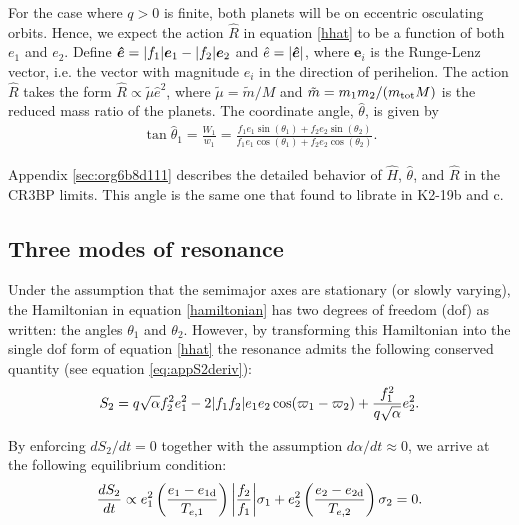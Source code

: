 \documentclass[usenatbib,twocolumn]{mnras}
\renewcommand{\v}[1]{\boldsymbol{ #1 }}
\DeclarePairedDelimiter{\abs}{|}{|}
\begin{document}
For the case where \(q>0\) is finite, both planets will be on eccentric
osculating orbits.  Hence, we expect the action \(\hat R\) in equation
\eqref{hhat} to be a function of both \(e_1\) and \(e_2\).  Define \(\v{\hat
e} = \abs{f_1}\v e_1 - \abs{f_2}\v e_2\) and \(\hat e = \abs{\v{\hat
e}}\), where \(\v e_i\) is the Runge-Lenz vector, i.e. the vector with
magnitude \(e_i\) in the direction of perihelion.  The action \(\hat R\)
takes the form \(\hat R \propto \tilde \mu \hat e^2\), where
\(\tilde\mu=\tilde m/M\) and \(\tilde m= m_1m_2/(m_{\rm tot}M)\) is the
reduced mass ratio of the planets.  The coordinate angle, \(\hat\theta\),
is given by
\begin{align}
\label{hattheta}
  \tan\hat{\theta}_1 = \frac{W_1}{w_1} = \frac{f_1 e_1\sin(\theta_1)
  + f_2e_2\sin(\theta_2)}{f_1e_1\cos(\theta_1) + f_2e_2\cos(\theta_2)}.
\end{align}

\noindent
Appendix \ref{sec:org6b8d111}
describes the detailed behavior of \(\hat H\), \(\hat \theta\),
and \(\hat R\) in the CR3BP limits.
This angle is the same one that \citet{petit_resonance_2020}
found to librate in K2-19b and c.

\subsection{Three modes of resonance}
\label{sec:org74c2e39}
Under the assumption that the semimajor axes are stationary (or slowly
varying), the Hamiltonian in equation \eqref{hamiltonian} has two
degrees of freedom (dof) as written: the angles \(\theta_1\) and
\(\theta_2\).  However, by transforming this Hamiltonian into the single
dof form of equation \eqref{hhat} the resonance admits the following
conserved quantity (see equation \eqref{eq:appS2deriv}):
\begin{align}
  \label{eq:s2}
  S_2 = q\sqrt{\alpha}f_2^2e_1^2
-2\abs{f_1f_2}e_1e_2\cos(\varpi_1-\varpi_2) + \frac{f_1^2}{q\sqrt\alpha}e_2^2.
\end{align}

\noindent
By enforcing \(dS_2/dt = 0\) together with the assumption \(d\alpha/dt
\approx 0\), we arrive at the following equilibrium condition:
\begin{align}
  \label{eq:S2eq}
  \frac{dS_2}{dt} \propto e_1^2\left(\frac{e_1-e_{1\rm d}}{T_{e,1}}\right)\abs*{\frac{f_2}{f_1}}
  \sigma_1
  + e_2^2\left(\frac{e_2-e_{2\rm d}}{T_{e,2}}\right)
  \sigma_2
  = 0.
\end{align}
\end{document}
